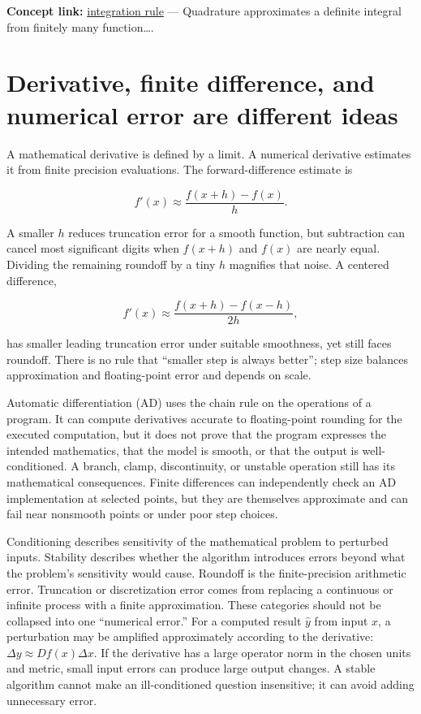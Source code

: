 \textbf{Concept link:} \hyperref[02-foundations-ii-ch022-integration-and-quadrature]{integration rule} --- Quadrature approximates a definite integral from finitely many function\ldots.

\section{Derivative, finite difference, and numerical error are different ideas}\label{02-foundations-ii-ch022-derivative-finite-difference-and-numerical-error-are-different-ideas}

A mathematical derivative is defined by a limit. A numerical derivative estimates it from finite precision evaluations. The forward-difference estimate is

\[
f'(x)\approx\frac{f(x+h)-f(x)}{h}.
\]

A smaller \(h\) reduces truncation error for a smooth function, but subtraction can cancel most significant digits when \(f(x+h)\) and \(f(x)\) are nearly equal. Dividing the remaining roundoff by a tiny \(h\) magnifies that noise. A centered difference,

\[
f'(x)\approx\frac{f(x+h)-f(x-h)}{2h},
\]

has smaller leading truncation error under suitable smoothness, yet still faces roundoff. There is no rule that ``smaller step is always better''; step size balances approximation and floating-point error and depends on scale.

Automatic differentiation (AD) uses the chain rule on the operations of a program. It can compute derivatives accurate to floating-point rounding for the executed computation, but it does not prove that the program expresses the intended mathematics, that the model is smooth, or that the output is well-conditioned. A branch, clamp, discontinuity, or unstable operation still has its mathematical consequences. Finite differences can independently check an AD implementation at selected points, but they are themselves approximate and can fail near nonsmooth points or under poor step choices.

Conditioning describes sensitivity of the mathematical problem to perturbed inputs. Stability describes whether the algorithm introduces errors beyond what the problem's sensitivity would cause. Roundoff is the finite-precision arithmetic error. Truncation or discretization error comes from replacing a continuous or infinite process with a finite approximation. These categories should not be collapsed into one ``numerical error.'' For a computed result \(\hat y\) from input \(x\), a perturbation may be amplified approximately according to the derivative: \(\Delta y\approx Df(x)\Delta x\). If the derivative has a large operator norm in the chosen units and metric, small input errors can produce large output changes. A stable algorithm cannot make an ill-conditioned question insensitive; it can avoid adding unnecessary error.


